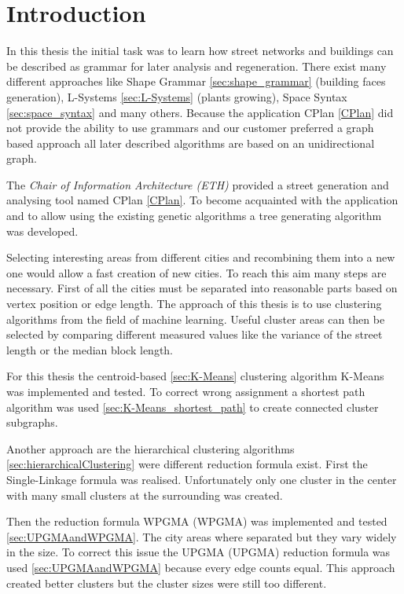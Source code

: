 \chapter{Introduction}
In this thesis the initial task was to learn how street networks and buildings can be described as grammar for later analysis and regeneration. There exist many different approaches like Shape Grammar \ref{sec:shape_grammar} (building faces generation), L-Systems \ref{sec:L-Systems} (plants growing), Space Syntax \ref{sec:space_syntax} and many others. 
Because the application CPlan \ref{CPlan} did not provide the ability to use grammars and our customer preferred a graph based approach all later described algorithms are based on an unidirectional graph.

The \textit{Chair of Information Architecture (ETH)} provided a street generation and analysing tool named CPlan \ref{CPlan}. To become acquainted with the application and to allow using the existing genetic algorithms a tree generating algorithm was developed. 

Selecting interesting areas from different cities and recombining them into a new one would allow a fast creation of new cities. To reach this aim many steps are necessary. First of all the cities must be separated into reasonable parts based on vertex position or edge length. The approach of this thesis is to use clustering algorithms from the field of machine learning. Useful cluster areas can then be selected by comparing different measured values like the variance of the street length or the median block length.

For this thesis the centroid-based \ref{sec:K-Means} clustering algorithm K-Means was implemented and tested. To correct wrong assignment a shortest path algorithm was used \ref{sec:K-Means_shortest_path} to create connected cluster subgraphs.

Another approach are the hierarchical clustering algorithms \ref{sec:hierarchicalClustering} were different reduction formula exist. First the Single-Linkage formula was realised. Unfortunately only one cluster in the center with many small clusters at the surrounding was created.

Then the reduction formula \acrshort{WPGMA} (\acrlong{WPGMA}) was implemented and tested \ref{sec:UPGMAandWPGMA}. The city areas where separated but they vary widely in the size. To correct this issue the \acrshort{UPGMA} (\acrlong{UPGMA}) reduction formula was used \ref{sec:UPGMAandWPGMA} because every edge counts equal. This approach created better clusters but the cluster sizes were still too different.

